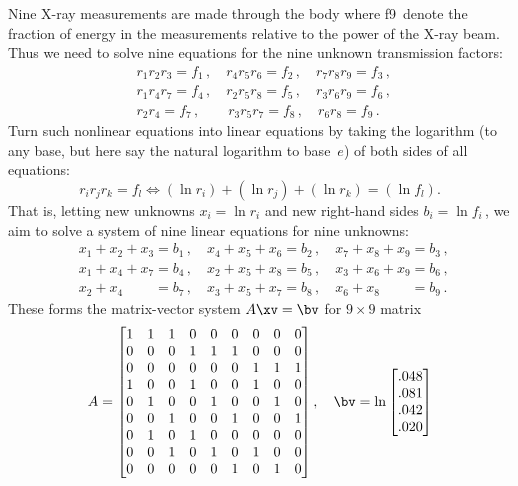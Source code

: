 \begin{example}
\begin{solution} 
Nine X-ray measurements are made through the body where \hlist f9\ denote the fraction of energy in the measurements relative to the power of the X-ray beam.
Thus we need to solve nine equations for the nine unknown transmission factors:
\begin{eqnarray*}
&&
r_1r_2r_3=f_1\,,\quad
r_4r_5r_6=f_2\,,\quad
r_7r_8r_9=f_3\,,\quad
\\&&
r_1r_4r_7=f_4\,,\quad
r_2r_5r_8=f_5\,,\quad
r_3r_6r_9=f_6\,,\quad
\\&&
r_2r_4=f_7\,,\qquad
r_3r_5r_7=f_8\,,\quad
r_6r_8=f_9\,.\quad
\end{eqnarray*}
Turn such nonlinear equations into linear equations by taking the logarithm (to any base, but here say the natural logarithm to base~\(e\)) of both sides of all equations:
\begin{equation*}
r_ir_jr_k=f_l \iff (\ln r_i)+(\ln r_j)+(\ln r_k)=(\ln f_l).
\end{equation*}
That is, letting new unknowns \(x_i=\ln r_i\) and new right-hand sides \(b_i=\ln f_i\)\,, we aim to solve a system of nine linear equations for nine unknowns:
\begin{eqnarray*}&&
x_1+x_2+x_3=b_1\,,\quad
x_4+x_5+x_6=b_2\,,\quad
x_7+x_8+x_9=b_3\,,
\\&&
x_1+x_4+x_7=b_4\,,\quad
x_2+x_5+x_8=b_5\,,\quad
x_3+x_6+x_9=b_6\,,\quad
\\&&
x_2+x_4\phantom{{}+x_4}=b_7\,,\quad
x_3+x_5+x_7=b_8\,,\quad
x_6+x_8\phantom{{}+x_4}=b_9\,.
\end{eqnarray*}
These forms the matrix-vector system \(A\xv=\bv\) for \(9\times9\) matrix
\begin{equation*}
A=\begin{bmatrix} 
 1&1&1&0&0&0&0&0&0 \\
 0&0&0&1&1&1&0&0&0 \\
 0&0&0&0&0&0&1&1&1 \\
 1&0&0&1&0&0&1&0&0 \\
 0&1&0&0&1&0&0&1&0 \\
 0&0&1&0&0&1&0&0&1 \\
 0&1&0&1&0&0&0&0&0 \\
 0&0&1&0&1&0&1&0&0 \\
 0&0&0&0&0&1&0&1&0 \end{bmatrix},\quad
 \bv=\ln\begin{bmatrix} .048
\\ .081
\\ .042
\\ .020

\end{bmatrix}
\end{equation*}
\end{solution}
\end{example}
